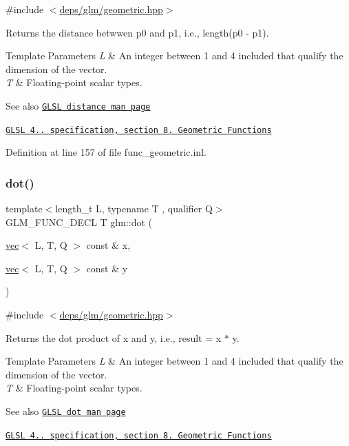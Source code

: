 {\ttfamily \#include $<$\hyperlink{geometric_8hpp}{deps/glm/geometric.\+hpp}$>$}

Returns the distance betwwen p0 and p1, i.\+e., length(p0 -\/ p1).


\begin{DoxyTemplParams}{Template Parameters}
{\em L} & An integer between 1 and 4 included that qualify the dimension of the vector. \\
\hline
{\em T} & Floating-\/point scalar types.\\
\hline
\end{DoxyTemplParams}
\begin{DoxySeeAlso}{See also}
\href{http://www.opengl.org/sdk/docs/manglsl/xhtml/distance.xml}{\tt G\+L\+SL distance man page} 

\href{http://www.opengl.org/registry/doc/GLSLangSpec.4.20.8.pdf}{\tt G\+L\+SL 4.. specification, section 8. Geometric Functions} 
\end{DoxySeeAlso}


Definition at line 157 of file func\+\_\+geometric.\+inl.

\mbox{\label{group__core__func__geometric_gaad6c5d9d39bdc0bf43baf1b22e147a0a}} 
\subsubsection{\texorpdfstring{dot()}{dot()}}
{\footnotesize\ttfamily template$<$length\+\_\+t L, typename T , qualifier Q$>$ \\
G\+L\+M\+\_\+\+F\+U\+N\+C\+\_\+\+D\+E\+CL T glm\+::dot (\begin{DoxyParamCaption}\item[{\hyperlink{structglm_1_1vec}{vec}$<$ L, T, Q $>$ const \&}]{x,  }\item[{\hyperlink{structglm_1_1vec}{vec}$<$ L, T, Q $>$ const \&}]{y }\end{DoxyParamCaption})}



{\ttfamily \#include $<$\hyperlink{geometric_8hpp}{deps/glm/geometric.\+hpp}$>$}

Returns the dot product of x and y, i.\+e., result = x $\ast$ y.


\begin{DoxyTemplParams}{Template Parameters}
{\em L} & An integer between 1 and 4 included that qualify the dimension of the vector. \\
\hline
{\em T} & Floating-\/point scalar types.\\
\hline
\end{DoxyTemplParams}
\begin{DoxySeeAlso}{See also}
\href{http://www.opengl.org/sdk/docs/manglsl/xhtml/dot.xml}{\tt G\+L\+SL dot man page} 

\href{http://www.opengl.org/registry/doc/GLSLangSpec.4.20.8.pdf}{\tt G\+L\+SL 4.. specification, section 8. Geometric Functions} 
\end{DoxySeeAlso}


